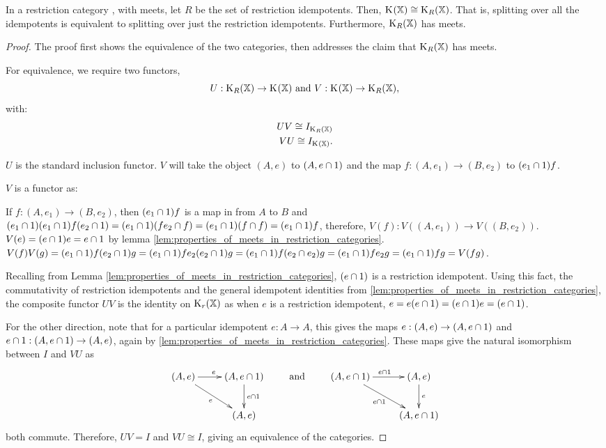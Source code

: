 \begin{proposition}\label{pro:in_rc_x_with_meets_split_x_is_cong_to_split_r_x}
  In a restriction category \X, with meets, let $R$ be the set of restriction idempotents.
  Then, $\text{K}_{}(\mathbb{X}) \cong \text{K}_{R}(\mathbb{X})$. That is, splitting over all the idempotents is equivalent to
  splitting over just the restriction idempotents.
  Furthermore, $\text{K}_{R}(\mathbb{X})$ has meets.
\end{proposition}
\begin{proof}
  The proof first shows the equivalence of the two categories, then addresses the claim
  that $\text{K}_{R}(\mathbb{X})$ has meets.

  For equivalence, we require two functors,
  \[
    U:\text{K}_{R}(\mathbb{X})\to\text{K}_{}(\mathbb{X})\text{ and }V:\text{K}_{}(\mathbb{X})\to\text{K}_{R}(\mathbb{X}),
  \]
  with:
  \begin{align}
    U V \cong I_{\text{K}_{R}(\mathbb{X})}\\
    V U \cong I_{\text{K}_{}(\mathbb{X})}.
  \end{align}


  $U$ is the standard inclusion functor. $V$ will take the object $(A,e)$ to
  $(A,e\cap 1)$ and the map $f:(A,e_1)\to (B,e_2)$ to $(e_1\cap 1)f $.

  $V$ is a functor as:
  \begin{description}
     If  $f:(A,e_1) \to (B,e_2)$, then
      $(e_1\cap 1) f $ is a map in \X from $A$ to $B$ and
      $ (e_1\cap 1)(e_1\cap 1) f  (e_2 \cap 1) =
      (e_1\cap 1) (f  e_2 \cap f ) = (e_1\cap 1) (f \cap f)= (e_1\cap 1) f$, therefore,
      $V(f):V((A,e_1)) \to V((B,e_2))$.
     $V(e) = (e\cap 1 ) e = e \cap 1$ by
      lemma \ref{lem:properties_of_meets_in_restriction_categories}.
     $V(f) V(g)
      = (e_1\cap 1 ) f (e_2 \cap 1) g
      = (e_1\cap 1 ) f e_2 (e_2 \cap 1) g
      = (e_1\cap 1 ) f  (e_2 \cap e_{2}) g
      = (e_1\cap 1 ) f e_2 g
      = (e_1\cap 1 ) f g
      = V(f g)$.
  \end{description}

  Recalling from Lemma \ref{lem:properties_of_meets_in_restriction_categories}, $(e\cap 1)$
  is a restriction idempotent. Using this fact, the commutativity of restriction idempotents
  and the general idempotent identities from
  \ref{lem:properties_of_meets_in_restriction_categories}, the composite functor $U V$ is
  the identity on $\text{K}_{r}(\mathbb{X})$ as when $e$ is a restriction idempotent,
  $e = e (e\cap 1) = (e\cap 1) e = (e\cap 1)$.

  For the other direction,  note that for a particular idempotent $e:A\to A$,  this gives the
  maps $e:(A,e)\to(A,e\cap 1)$ and $e\cap 1 : (A,e\cap 1) \to (A,e)$, again by
  \ref{lem:properties_of_meets_in_restriction_categories}. These maps give the natural
  isomorphism between $I$ and $V U$ as
  \[
    \xymatrix{
      (A,e)\ar[r]^e \ar[dr]_{e} &(A,e\meet 1)\ar[d]^{e\meet 1}\\
      &(A,e)
    }\qquad \text{ and  }\qquad
    \xymatrix{
      (A,e\meet 1)\ar[r]^{e\meet 1} \ar[dr]_{e\meet 1} &(A,e)\ar[d]^{e}\\
      &(A,e\meet 1)
    }
  \]
  both commute. Therefore, $U V = I$ and $V U \cong I$, giving an equivalence of the categories.


\end{proof}
